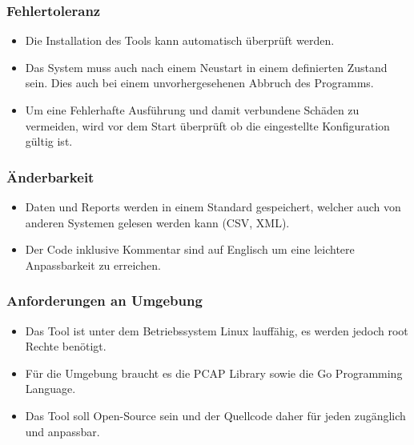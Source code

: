 \subsubsection{Fehlertoleranz}
\begin{itemize}
\item Die Installation des Tools kann automatisch überprüft werden.
\item Das System muss auch nach einem Neustart in einem definierten Zustand sein. Dies auch bei einem unvorhergesehenen Abbruch des Programms. 
\item Um eine Fehlerhafte Ausführung und damit verbundene Schäden zu vermeiden, wird vor dem Start überprüft ob die eingestellte Konfiguration gültig ist.
\end{itemize}

\subsubsection{Änderbarkeit}
\begin{itemize}
\item Daten und Reports werden in einem Standard gespeichert, welcher auch von anderen Systemen gelesen werden kann (CSV, XML).
\item Der Code inklusive Kommentar sind auf Englisch um eine leichtere Anpassbarkeit zu erreichen.
\end{itemize}

\subsubsection{Anforderungen an Umgebung}
\begin{itemize}
\item Das Tool ist unter dem Betriebssystem Linux lauffähig, es werden jedoch root Rechte benötigt.
\item Für die Umgebung braucht es die \acs{PCAP} Library sowie die Go Programming Language.
\item Das Tool soll Open-Source sein und der Quellcode daher für jeden zugänglich und anpassbar.
\end{itemize}